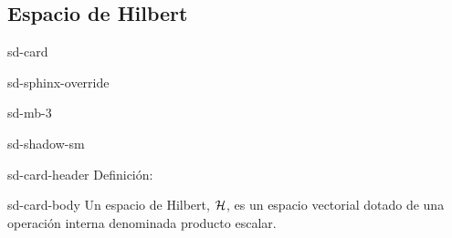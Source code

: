 \documentclass[letterpaper,10pt,english]{jupyterBook}
\newcommand{\Hil}{{\cal H}}
\begin{document}
\subsection{Espacio de Hilbert}
\label{\detokenize{docs/Part_01_Formalismo/Chapter_01_02_Formalismo_matem_xe1tico/01_02_Vectores_myst:espacio-de-hilbert}}
\begin{sphinxuseclass}{sd-card}
\begin{sphinxuseclass}{sd-sphinx-override}
\begin{sphinxuseclass}{sd-mb-3}
\begin{sphinxuseclass}{sd-shadow-sm}
\begin{sphinxuseclass}{sd-card-header}
\sphinxAtStartPar
Definición:

\end{sphinxuseclass}
\begin{sphinxuseclass}{sd-card-body}
\sphinxAtStartPar
Un  espacio de Hilbert,  \({\Hil}\), es un espacio vectorial
dotado de una operación interna   denominada producto escalar.

\end{sphinxuseclass}
\end{sphinxuseclass}
\end{sphinxuseclass}
\end{sphinxuseclass}
\end{sphinxuseclass}
\end{document}
